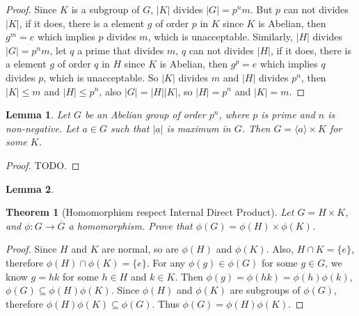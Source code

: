 \documentclass[14pt]{extarticle}
\newtheorem{theorem}{Theorem}[section]
\newtheorem{lemma}{Lemma}[section]
\newcommand{\1}{\{e\}}
\newcommand{\cyc}[1]{\langle #1 \rangle}
\begin{document}
\begin{proof}
  Since $K$ is a subgroup of $G$, $|K|$ divides $|G| = p^nm$.
  But $p$ can not divides $|K|$, if it does, there is a element $g$ of order $p$ in $K$
  since $K$ is Abelian, then $g^m = e$ which implies $p$ divides $m$, 
  which is unacceptable.
  Similarly, $|H|$ divides $|G| = p^nm$, let $q$ a prime that divides $m$, $q$ can not divides $|H|$,
  if it does, there is a element $g$ of order $q$ in $H$ since $K$ is Abelian,
  then $g^p = e$ which implies $q$ divides $p$,
  which is unacceptable.
  So $|K|$ divides $m$ and $|H|$ divides $p^n$,
  then $|K| \leq m$ and $|H| \leq p^n$, also $|G| = |H||K|$, so $|H| = p^n$ and $|K| = m$.
\end{proof}

\begin{lemma}
  Let $G$ be an Abelian group of order $p^n$, where $p$ is prime and $n$ is non-negative.
  Let $a \in G$ such that $|a|$ is maximum in $G$. Then $G = \cyc{a} \times K$ for some $K$.
\end{lemma}
\begin{proof}
  TODO.
\end{proof}

\begin{lemma}
  
\end{lemma}

\begin{theorem}[Homomorphism respect Internal Direct Product]
  Let $G = H \times K$, and $\phi : G \rightarrow \overline{G}$ a homomorphism.
  Prove that $\phi(G) = \phi(H) \times \phi(K)$.
\end{theorem}
\begin{proof}
  Since $H$ and $K$ are normal, so are $\phi(H)$ and $\phi(K)$.
  Also, $H \cap K = \1$, therefore $\phi(H) \cap \phi(K) = \1$.
  For any $\phi(g) \in \phi(G)$ for some $g \in G$, we know $g = hk$ for some $h \in H$ and $k \in K$.
  Then $\phi(g) = \phi(hk) = \phi(h)\phi(k)$, $\phi(G) \subseteq \phi(H)\phi(K)$.
  Since $\phi(H)$ and $\phi(K)$ are subgroups of $\phi(G)$, therefore $\phi(H)\phi(K) \subseteq \phi(G)$.
  Thus $\phi(G) = \phi(H)\phi(K)$.
\end{proof}
\end{document}
